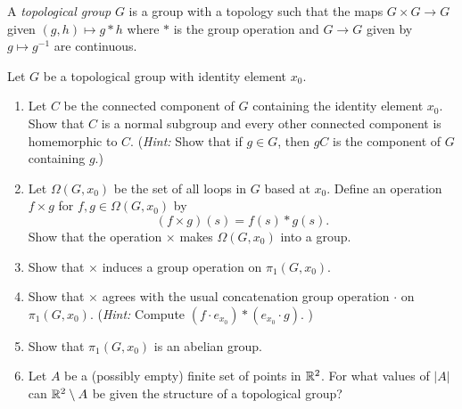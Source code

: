 \documentclass[12pt]{article}
\begin{document}


\begin{problem}{1}
\begin{definition}
    A \emph{topological group}  $G$ is a group with a topology such that the maps $G \times G \to G$ given $(g,h) \mapsto g * h$ where $*$ is the group operation and $G \to G$ given by $g \mapsto g^{-1}$ are continuous. 
\end{definition}
    Let $G$ be a topological group with identity element $x_0$.
    \begin{enumerate}
    
    \item Let $C$ be the connected component of $G$ containing the identity element $x_0$. Show that $C$ is a normal subgroup and every other connected component is homemorphic to $C$. (\emph{Hint:} Show that if $g \in G$, then $gC$ is the component of $G$ containing $g$.)

    \item Let $\Omega(G,x_0)$ be the set of all loops in $G$ based at $x_0$. Define an operation $f \times g$ for $f, g \in \Omega(G,x_0)$ by
    \[ (f \times g)(s) = f(s) \ast g(s). \]
    Show that the operation $\times$ makes $\Omega(G,x_0)$ into a group. 

    \item Show that $\times$ induces a group operation on $\pi_1(G,x_0)$.

    \item Show that $\times$ agrees with the usual concatenation group operation $\cdot$ on $\pi_1(G,x_0)$. (\emph{Hint:} Compute $(f \cdot e_{x_0}) \ast (e_{x_0} \cdot g)$. )

    \item Show that $\pi_1(G,x_0)$ is an abelian group.

    \item Let $A$ be a (possibly empty) finite set of points in $\mathbb R^2$. For what values of $|A|$ can $\mathbb R^2 \setminus A$ be given the structure of a topological group? 
    \end{enumerate}
\end{problem}
\end{document}
